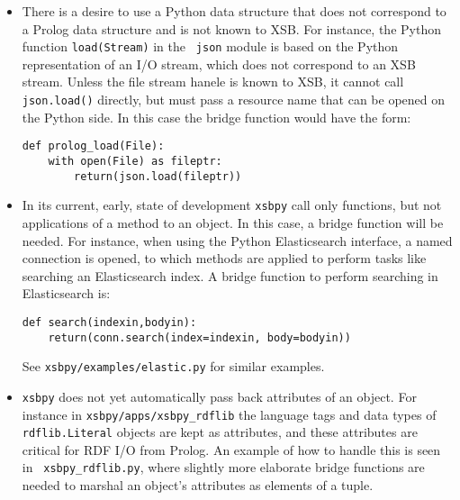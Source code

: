 \begin{itemize}
  \item There is a desire to use a Python data structure that does not
    correspond to a Prolog data structure and is not known to XSB.
    For instance, the Python function {\tt load(Stream)} in the {\tt
      json} module is based on the Python representation of an I/O
    stream, which does not correspond to an XSB stream.  Unless the
    file stream hanele is known to XSB, it cannot call {\tt
      json.load()} directly, but must pass a resource name that can be
    opened on the Python side.  In this case the bridge function would
    have the form:

\begin{verbatim}   
def prolog_load(File):
    with open(File) as fileptr:
        return(json.load(fileptr))
\end{verbatim}

\item In its current, early, state of development {\tt xsbpy} call
  only functions, but not applications of a method to an object. In
  this case, a bridge function will be needed.  For instance, when
  using the Python Elasticsearch interface, a named connection is
  opened, to which methods are applied to perform tasks like searching
  an Elasticsearch index.  A bridge function to perform searching in
  Elasticsearch is:

\begin{verbatim}
def search(indexin,bodyin):
    return(conn.search(index=indexin, body=bodyin))
\end{verbatim}

\noindent
See {\tt xsbpy/examples/elastic.py} for similar examples.

\item {\tt xsbpy} does not yet automatically pass back attributes of
  an object.  For instance in {\tt xsbpy/apps/xsbpy\_rdflib} the
  language tags and data types of {\tt rdflib.Literal} objects are
  kept as attributes, and these attributes are critical for RDF I/O
  from Prolog. An example of how to handle this is seen in {\tt
    xsbpy\_rdflib.py}, where slightly more elaborate bridge functions
  are needed to marshal an object's attributes as elements of a tuple.

\end{itemize}


